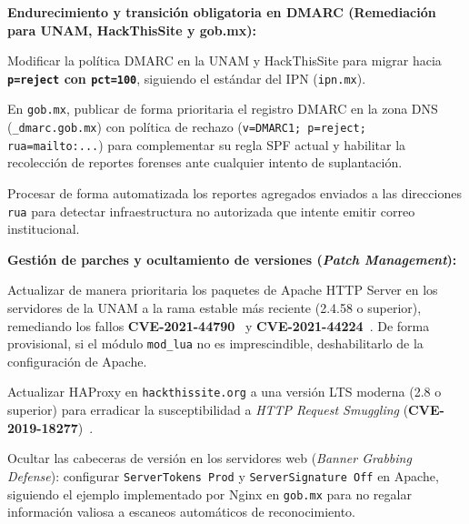 \begin{enumerateColor}
    \item \textbf{Endurecimiento y transición obligatoria en DMARC (Remediación para UNAM, HackThisSite y gob.mx):}
    \begin{itemizeColor}
        \item Modificar la política DMARC en la UNAM y HackThisSite para migrar hacia \textbf{\texttt{p=reject} con \texttt{pct=100}}, siguiendo el estándar del IPN (\texttt{ipn.mx}).
        \item En \texttt{gob.mx}, publicar de forma prioritaria el registro DMARC en la zona DNS (\texttt{\_dmarc.gob.mx}) con política de rechazo (\texttt{v=DMARC1; p=reject; rua=mailto:...}) para complementar su regla SPF actual y habilitar la recolección de reportes forenses ante cualquier intento de suplantación.
        \item Procesar de forma automatizada los reportes agregados enviados a las direcciones \texttt{rua} para detectar infraestructura no autorizada que intente emitir correo institucional.
    \end{itemizeColor}

    \item \textbf{Gestión de parches y ocultamiento de versiones (\textit{Patch Management}):}
    \begin{itemizeColor}
        \item Actualizar de manera prioritaria los paquetes de Apache HTTP Server en los servidores de la UNAM a la rama estable más reciente (2.4.58 o superior), remediando los fallos \textbf{CVE-2021-44790}~\cite{cve_2021_44790} y \textbf{CVE-2021-44224}~\cite{cve_2021_44224}. De forma provisional, si el módulo \texttt{mod\_lua} no es imprescindible, deshabilitarlo de la configuración de Apache.
        \item Actualizar HAProxy en \texttt{hackthissite.org} a una versión LTS moderna (2.8 o superior) para erradicar la susceptibilidad a \textit{HTTP Request Smuggling} (\textbf{CVE-2019-18277})~\cite{cve_2019_18277}.
        \item Ocultar las cabeceras de versión en los servidores web (\textit{Banner Grabbing Defense}): configurar \texttt{ServerTokens Prod} y \texttt{ServerSignature Off} en Apache, siguiendo el ejemplo implementado por Nginx en \texttt{gob.mx} para no regalar información valiosa a escaneos automáticos de reconocimiento.
    \end{itemizeColor}


\end{enumerateColor}

